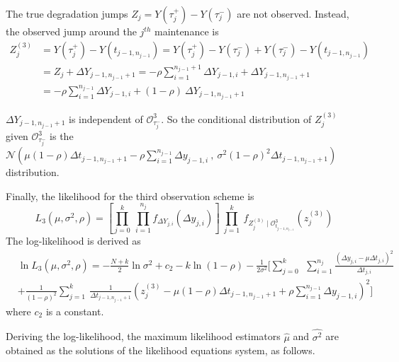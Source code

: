 \noindent The true degradation jumps $Z_j = Y(\tau_{j}^+) - Y(\tau_{j}^-)$ are not observed.
Instead, the observed jump around the $j^{th}$ maintenance is 
\begin{align}
Z_j^{(3)} &= Y(\tau_j^+)-Y(t_{j-1,n_{j-1}}) = Y(\tau_j^+)-Y(\tau_j^-)+Y(\tau_j^-)-Y(t_{j-1,n_{j-1}}) \nonumber \\
&= Z_j +\Delta Y_{j-1,n_{j-1}+1} = -\rho\sum\limits_{i=1}^{n_{j-1}+1}\Delta Y_{j-1,i} + \Delta Y_{j-1,n_{j-1}+1} \nonumber \\
&= -\rho\sum\limits_{i=1}^{n_{j-1}}\Delta Y_{j-1,i} + (1-\rho)\ \Delta Y_{j-1,n_{j-1}+1} \label{eq:Zj3}
\end{align}

\noindent $\Delta Y_{j-1,n_{j-1}+1}$ is independent of $\mathcal{O}_{\tau_j^-}^3$. So the conditional distribution of $Z_j^{(3)}$ given $\mathcal{O}_{\tau_j^-}^3$ is the $\mathcal{N}\left(\mu (1-\rho) \Delta t_{j-1,n_{j-1}+1}-\rho \sum\limits_{i=1}^{n_{j-1}} \Delta y_{j-1,i}\ ,\ \sigma^2 (1-\rho)^2 \Delta t_{j-1,n_{j-1}+1}\right)$ distribution.

\noindent Finally, the likelihood for the third observation scheme is
\begin{equation}
L_3\left(\mu,\sigma^2,\rho \right)
= \left[ \prod \limits_{j=0}^{k} \ \prod \limits_{i=1}^{n_{j}}  f_{\Delta Y_{j,i}}(\Delta y_{j,i}) \right]\ 
 \prod \limits_{j=1}^{k}\ f_{Z_j^{(3)} \mid  \mathcal{O}_{t_{j-1,n_{j-1}}}^3}(z_j^{(3)}) 
\label{eq:like_scheme3}
\end{equation}
\noindent The log-likelihood is derived as
\begin{align}
&\ln L_3\left(\mu,\sigma^2,\rho \right)= - \frac{N+k}{2} \ln \sigma^2 + c_2 - k \ln (1-\rho)
- \frac{1}{2 \sigma^2} \Bigg[\sum\limits_{j=0}^{k}\ \ \sum\limits_{i=1}^{n_j}
\frac{\left(\Delta y_{j,i} -\mu \Delta t_{j,i}\right)^2}{\Delta t_{j,i}} \nonumber\\
&+ \frac{1}{(1-\rho)^2} \sum\limits_{j=1}^{k}\ \frac{1}{\Delta t_{j-1,n_{j-1}+1}}
\left(z_j^{(3)}-\mu (1-\rho)\Delta t_{j-1,n_{j-1}+1}+\rho \sum \limits_{i=1}^{n_{j-1}}\Delta y_{j-1,i}\right)^2 \Bigg]
\label{eq:loglike_scheme3}
\end{align}
\noindent where $c_2$ is a constant.

\vspace{3mm}

\noindent Deriving the log-likelihood, the maximum likelihood estimators $\hat{\mu}$ and $\hat{\sigma^2}$ are obtained as the solutions of the likelihood equations system, as follows.


